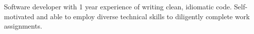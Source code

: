 \documentclass[11pt, a4paper, sans]{moderncv}        %
\begin{document}
\makecvtitle


Software developer with 1 year experience of writing clean, idiomatic code. Self-motivated and able to employ diverse technical skills to diligently complete work assignments.
\end{document}
